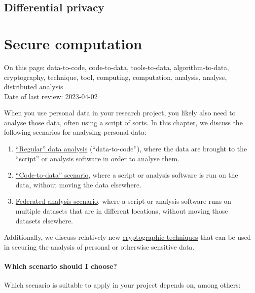 \documentclass[
]{book}
\providecommand{\tightlist}{%
  \setlength{\itemsep}{0pt}\setlength{\parskip}{0pt}}
\begin{document}
\hypertarget{differential-privacy}{%
\section{Differential privacy}\label{differential-privacy}}

\hypertarget{secure-computation}{%
\chapter{Secure computation}\label{secure-computation}}

On this page: data-to-code, code-to-data, tools-to-data, algorithm-to-data,
cryptography, technique, tool, computing, computation, analysis, analyse,
distributed analysis\\
Date of last review: 2023-04-02

When you use personal data in your research project, you likely also need to
analyse those data, often using a script of sorts. In this chapter, we discuss
the following scenarios for analysing personal data:

\begin{enumerate}
\def\labelenumi{\arabic{enumi}.}
\tightlist
\item
  \protect\hyperlink{data-to-code}{``Regular'' data analysis} (``data-to-code''), where the data are
  brought to the ``script'' or analysis software in order to analyse them.
\item
  \protect\hyperlink{code-to-data}{``Code-to-data'' scenario}, where a script or analysis software
  is run on the data, without moving the data elsewhere.
\item
  \protect\hyperlink{federated-analysis}{Federated analysis scenario}, where a script or
  analysis software runs on multiple datasets that are in different locations,
  without moving those datasets elsewhere.
\end{enumerate}

Additionally, we discuss relatively new
\protect\hyperlink{computational-cryptography}{cryptographic techniques} that can be used in
securing the analysis of personal or otherwise sensitive data.

\hypertarget{which-scenario-should-i-choose}{%
\subsubsection{Which scenario should I choose?}\label{which-scenario-should-i-choose}}

Which scenario is suitable to apply in your project depends on, among others:
\end{document}
